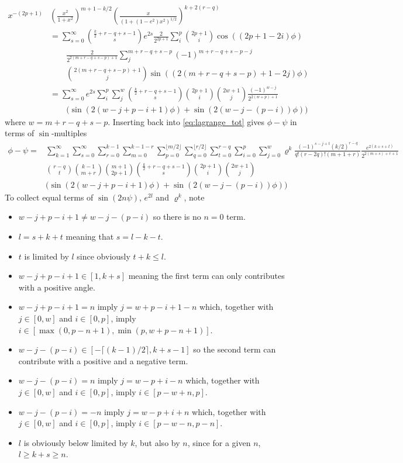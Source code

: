 \documentclass[a4paper]{amsart}
\begin{document}
\begin{align*}
x^{-(2p+1)}&\left(\frac{x^2}{1 + x^2}\right)^{m+1-k/2}\left(\frac{x}{(1+(1-e^2)x^2)^{1/2}}\right)^{k+2(r-q)}\\
&=\sum_{s=0}^\infty\binom{\frac{k}{2}+r-q+s-1}{s}e^{2s}
\frac{2}{2^{2p+1}}\sum_i^{p}\binom{2p+1}{i}\cos((2p+1-2i)\phi)\\
&\quad\quad\frac{2}{2^{2(m+r-q+s-p)+1}}\sum_j^{m+r-q+s-p}(-1)^{m+r-q+s-p-j}\\
&\quad\quad\binom{2(m+r-q+s-p)+1}{j}\sin((2(m+r-q+s-p)+1-2j)\phi)\\
%
&=\sum_{s=0}^\infty e^{2s}\sum_i^{p}\sum_j^w\binom{\frac{k}{2}+r-q+s-1}{s}\binom{2p+1}{i}\binom{2w+1}{j}
\frac{(-1)^{w-j}}{2^{2(w+p)+1}}\\
&\quad\quad\big(\sin(2(w-j+p-i+1)\phi) + \sin(2(w-j-(p-i))\phi)\big)
\end{align*}
where $w=m+r-q+s-p$. Inserting back into \eqref{eq:lagrange_tot} gives $\phi-\psi$ in terms of $\sin$-multiples
\begin{align*}
\phi-\psi = &\sum_{k=1}^\infty\sum_{s=0}^\infty\sum^{k-1}_{r=0}\sum^{k-1-r}_{m=0}\sum^{\lfloor m/2\rfloor}_{p=0}\sum_{q=0}^{\lfloor r/2\rfloor}\!\sum_{t=0}^{r-q}\sum_{i=0}^{p}\sum_{j=0}^{w}\varrho^k\frac{(-1)^{s-j+t}(k/2)^{\overline{r-q}}}{q!(r\!-\!2q)!(m\!+\!1\!+\!r)}\frac{e^{2(k+s+t)}}{2^{2(m+s)+r+1}}\\
&\binom{r-q}{t}\binom{k-1}{m+r}\binom{m+1}{2p+1}\binom{\frac{k}{2}+r-q+s-1}{s}\binom{2p+1}{i}\binom{2w+1}{j}\\
&\big(\sin(2(w-j+p-i+1)\phi) + \sin(2(w-j-(p-i))\phi)\big)
\end{align*}
To collect equal terms of $\sin(2n\psi)$, $e^{2l}$ and $\varrho^{k}$, note
\begin{itemize}
\item $w-j+p-i+1 \neq w-j-(p-i)$ so there is no $n=0$ term.
\item $l=s+k+t$ meaning that $s=l-k-t$.
\item $t$ is limited by $l$ since obviously $t+k\leq l$.
\item $w-j+p-i+1\in [1, k+s]$ meaning the first term can only contributes with a positive angle.
\item $w-j+p-i+1=n$ imply $j=w+p-i+1-n$ which, together with $j\in[0,w]$ and $i\in[0,p]$, imply $i\in[\max(0,p-n+1), \min(p, w+p-n+1)]$.
\item $w-j-(p-i)\in [-\lceil (k-1)/2\rceil, k+s-1]$ so the second term can contribute with a positive and a negative term.
\item $w-j-(p-i)=n$ imply $j = w-p+i-n$ which, together with $j\in[0,w]$ and $i\in[0,p]$, imply $i\in[p-w+n, p]$.
\item $w-j-(p-i)=-n$ imply $j = w-p+i+n$ which, together with $j\in[0,w]$ and $i\in[0,p]$, imply $i\in[p-w-n, p-n]$.
\item $l$ is obviously below limited by $k$, but also by $n$, since for a given $n$, $l\geq k+s\geq n$.
\end{itemize}
\end{document}
